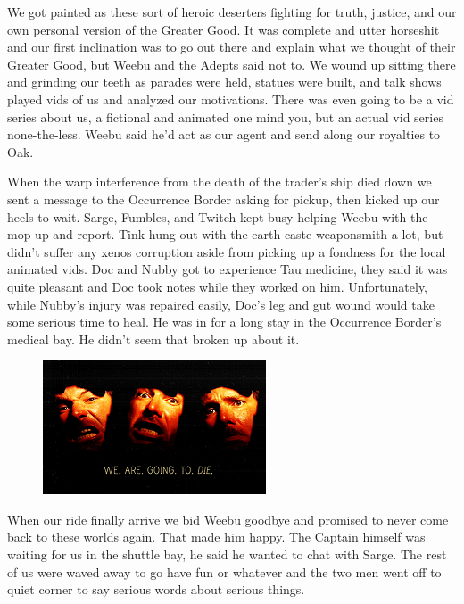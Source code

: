 We got painted as these sort of heroic deserters fighting for truth, justice, and our own personal version of the Greater Good. 
It was complete and utter horseshit and our first inclination was to go out there and explain what we thought of their Greater Good, but Weebu and the Adepts said not to. 
We wound up sitting there and grinding our teeth as parades were held, statues were built, and talk shows played vids of us and analyzed our motivations. 
There was even going to be a vid series about us, a fictional and animated one mind you, but an actual vid series none-the-less. 
Weebu said he'd act as our agent and send along our royalties to Oak.

When the warp interference from the death of the trader's ship died down we sent a message to the Occurrence Border asking for pickup, then kicked up our heels to wait. 
Sarge, Fumbles, and Twitch kept busy helping Weebu with the mop-up and report. 
Tink hung out with the earth-caste weaponsmith a lot, but didn't suffer any xenos corruption aside from picking up a fondness for the local animated vids. 
Doc and Nubby got to experience Tau medicine, they said it was quite pleasant and Doc took notes while they worked on him. 
Unfortunately, while Nubby's injury was repaired easily, Doc's leg and gut wound would take some serious time to heal. 
He was in for a long stay in the Occurrence Border's medical bay. 
He didn't seem that broken up about it.

\begin{figure}
	\begin{center}
		\includegraphics[width=\figwidth]{pics/10/77.png}
	\end{center}
\end{figure}
When our ride finally arrive we bid Weebu goodbye and promised to never come back to these worlds again. 
That made him happy. 
The Captain himself was waiting for us in the shuttle bay, he said he wanted to chat with Sarge. 
The rest of us were waved away to go have fun or whatever and the two men went off to quiet corner to say serious words about serious things.

